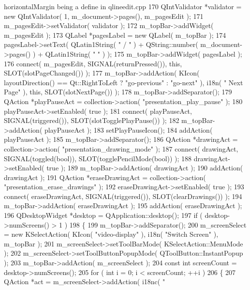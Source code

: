 \begin{DoxyCode}
{       horizontalMargin being a define in qlineedit.cpp}
170     QIntValidator *validator = new QIntValidator( 1, m\_document->pages(), m\_pagesEdit );
171     m\_pagesEdit->setValidator( validator );
172     m\_topBar->addWidget( m\_pagesEdit );
173     QLabel *pagesLabel = new QLabel( m\_topBar );
174     pagesLabel->setText( QLatin1String( " / " ) + QString::number( m\_document->pages() ) + QLatin1String( "
       " ) );
175     m\_topBar->addWidget( pagesLabel );
176     connect( m\_pagesEdit, SIGNAL(returnPressed()), this, SLOT(slotPageChanged()) );
177     m\_topBar->addAction( KIcon( layoutDirection() == Qt::RightToLeft ? "go-previous" : "go-next" ), i18n( "
      Next Page" ), this, SLOT(slotNextPage()) );
178     m\_topBar->addSeparator();
179     QAction *playPauseAct = collection->action( "presentation\_play\_pause" );
180     playPauseAct->setEnabled( true );
181     connect( playPauseAct, SIGNAL(triggered()), SLOT(slotTogglePlayPause()) );
182     m\_topBar->addAction( playPauseAct );
183     setPlayPauseIcon();
184     addAction( playPauseAct );
185     m\_topBar->addSeparator();
186     QAction *drawingAct = collection->action( "presentation\_drawing\_mode" );
187     connect( drawingAct, SIGNAL(toggled(\textcolor{keywordtype}{bool})), SLOT(togglePencilMode(\textcolor{keywordtype}{bool})) );
188     drawingAct->setEnabled( true );
189     m\_topBar->addAction( drawingAct );
190     addAction( drawingAct );
191     QAction *eraseDrawingAct = collection->action( "presentation\_erase\_drawings" );
192     eraseDrawingAct->setEnabled( true );
193     connect( eraseDrawingAct, SIGNAL(triggered()), SLOT(clearDrawings()) );
194     m\_topBar->addAction( eraseDrawingAct );
195     addAction( eraseDrawingAct );
196     QDesktopWidget *desktop = QApplication::desktop();
197     if ( desktop->numScreens() > 1 )
198     \{
199         m\_topBar->addSeparator();
200         m\_screenSelect = \textcolor{keyword}{new} KSelectAction( KIcon( \textcolor{stringliteral}{"video-display"} ), i18n( \textcolor{stringliteral}{"Switch Screen"} ), m\_topBar );
201         m\_screenSelect->setToolBarMode( KSelectAction::MenuMode );
202         m\_screenSelect->setToolButtonPopupMode( QToolButton::InstantPopup );
203         m\_topBar->addAction( m\_screenSelect );
204         \textcolor{keyword}{const} \textcolor{keywordtype}{int} screenCount = desktop->numScreens();
205         \textcolor{keywordflow}{for} ( \textcolor{keywordtype}{int} i = 0; i < screenCount; ++i )
206         \{
207             QAction *act = m\_screenSelect->addAction( i18nc( \textcolor{stringliteral}{"%
}
\end{DoxyCode}
